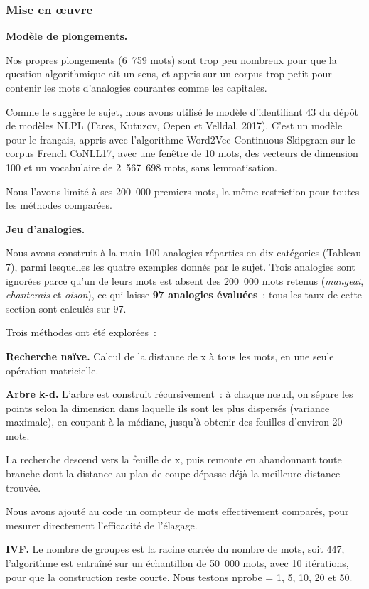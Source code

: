 \documentclass[11pt,a4paper]{article}
\begin{document}
\subsubsection{Mise en œuvre}

\textbf{Modèle de plongements.}\nopagebreak

Nos propres plongements (6~759 mots) sont trop peu nombreux pour que la question algorithmique ait un sens, et appris sur un corpus trop petit pour contenir les mots d’analogies courantes comme les capitales.

Comme le suggère le sujet, nous avons utilisé le modèle d’identifiant 43 du dépôt de modèles NLPL (Fares, Kutuzov, Oepen et Velldal, 2017). C’est un modèle pour le français, appris avec l’algorithme Word2Vec Continuous Skipgram sur le corpus French CoNLL17, avec une fenêtre de 10 mots, des vecteurs de dimension 100 et un vocabulaire de 2~567~698 mots, sans lemmatisation.

Nous l’avons limité à ses 200~000 premiers mots, la même restriction pour toutes les méthodes comparées.

\textbf{Jeu d’analogies.}\nopagebreak

Nous avons construit à la main 100 analogies réparties en dix catégories (Tableau 7), parmi lesquelles les quatre exemples donnés par le sujet. Trois analogies sont ignorées parce qu’un de leurs mots est absent des 200~000 mots retenus (\emph{mangeai}, \emph{chanterais} et \emph{oison}), ce qui laisse \textbf{97 analogies évaluées}~: tous les taux de cette section sont calculés sur 97.

Trois méthodes ont été explorées~:

\textbf{Recherche naïve.} Calcul de la distance de x à tous les mots, en une seule opération matricielle.

\textbf{Arbre k-d.} L’arbre est construit récursivement~: à chaque nœud, on sépare les points selon la dimension dans laquelle ils sont les plus dispersés (variance maximale), en coupant à la médiane, jusqu’à obtenir des feuilles d’environ 20 mots.

La recherche descend vers la feuille de x, puis remonte en abandonnant toute branche dont la distance au plan de coupe dépasse déjà la meilleure distance trouvée.

Nous avons ajouté au code un compteur de mots effectivement comparés, pour mesurer directement l’efficacité de l’élagage.

\textbf{IVF.} Le nombre de groupes est la racine carrée du nombre de mots, soit 447, l’algorithme est entraîné sur un échantillon de 50~000 mots, avec 10 itérations, pour que la construction reste courte. Nous testons nprobe = 1, 5, 10, 20 et 50.
\end{document}
